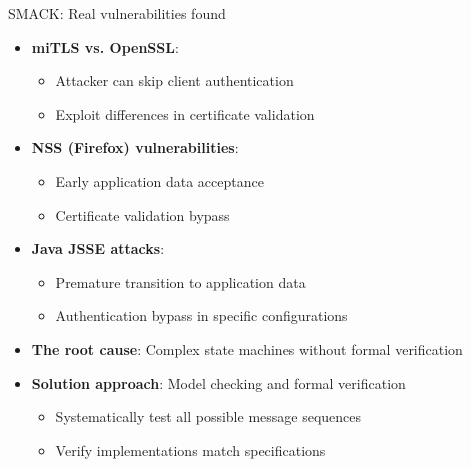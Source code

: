 \documentclass[aspectratio=169, lualatex, handout]{beamer}
\begin{document}
\begin{frame}{SMACK: Real vulnerabilities found}
	\begin{itemize}[<+->]
		\item \textbf{miTLS vs. OpenSSL}:
		      \begin{itemize}
			      \item Attacker can skip client authentication
			      \item Exploit differences in certificate validation
		      \end{itemize}
		\item \textbf{NSS (Firefox) vulnerabilities}:
		      \begin{itemize}
			      \item Early application data acceptance
			      \item Certificate validation bypass
		      \end{itemize}
		\item \textbf{Java JSSE attacks}:
		      \begin{itemize}
			      \item Premature transition to application data
			      \item Authentication bypass in specific configurations
		      \end{itemize}
		\item \textbf{The root cause}: Complex state machines without formal verification
		\item \textbf{Solution approach}: Model checking and formal verification
		      \begin{itemize}
			      \item Systematically test all possible message sequences
			      \item Verify implementations match specifications
		      \end{itemize}
	\end{itemize}
\end{frame}
\end{document}
